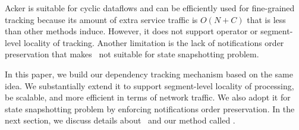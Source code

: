 Acker is suitable for cyclic dataflows and can be efficiently used for fine-grained tracking because its amount of extra service traffic is $O(N+C)$ that is less than other methods induce. However, it does not support operator or segment-level locality of tracking. Another limitation is the lack of notifications order preservation that makes \acker\ not suitable for state snapshotting problem.

In this paper, we build our dependency tracking mechanism based on the same idea. We substantially extend it to support segment-level locality of processing, be scalable, and more efficient in terms of network traffic. We also adopt it for state snapshotting problem by enforcing notifications order preservation. In the next section, we discuss details about \acker\ and our method called \tracker .
